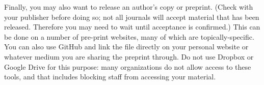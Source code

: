 Finally, you may also want to release an author's copy or preprint.
(Check with your publisher before doing so;
not all journals will accept material that has been released.
Therefore you may need to wait until acceptance is confirmed.)
This can be done on a number of pre-print websites,
many of which are topically-specific.
You can also use GitHub and link the file directly
on your personal website or whatever medium you are
sharing the preprint through.
Do not use Dropbox or Google Drive for this purpose:
many organizations do not allow access to these tools,
and that includes blocking staff from accessing your material.
